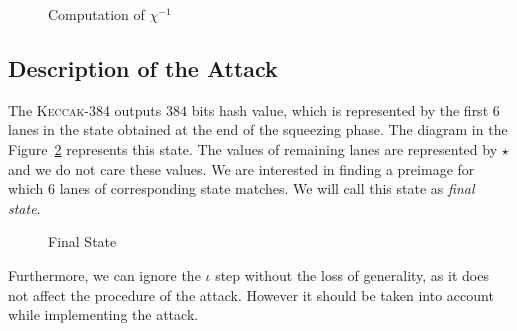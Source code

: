 \documentclass[runningheads]{llncs}
\newcommand{\Keccak}{\mbox{\textsc{Keccak}}}
\begin{document}
\begin{enumerate}
\begin{figure}[ht]
\begin{center}
\end{center}
\caption{Computation of $\chi^{-1}$\label{chi_inv2}}
\end{figure}

\end{enumerate}


\subsection{Description of the Attack}
The \Keccak-{384} outputs $384$ bits hash value, which is represented by the first $6$ lanes in the state obtained at the end of the squeezing phase. The diagram in the Figure~\ref{initial_sq} represents this state. The values of remaining lanes are represented by $\star$ and we do not care these values. We are interested in finding a preimage for which $6$ lanes of corresponding state matches. We will call this state as \emph{final state}.
\begin{figure}[ht]
\begin{center}
\end{center}
\caption{Final State\label{initial_sq}}
\end{figure}
Furthermore, we can ignore the {$\iota$} step without the loss of generality, as it does not affect the procedure of the attack. However it should be taken into account while implementing the attack.
\end{document}
